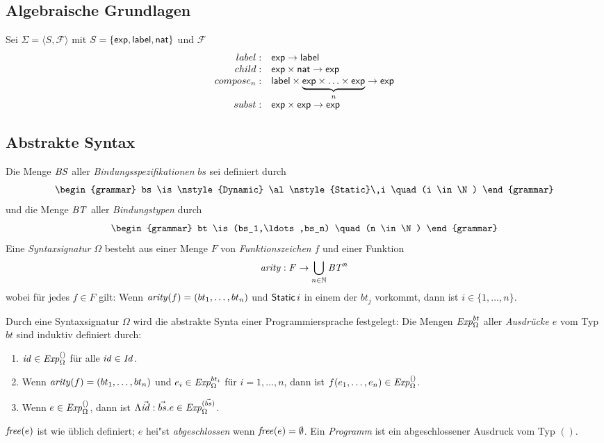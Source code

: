 \documentclass[12pt,a4paper]{article}
\begin{document}
\subsection*{Algebraische Grundlagen}

Sei $\Sigma = \langle S, \mathcal{F} \rangle$ mit 
$S = \{\mathsf{exp},\mathsf{label},\mathsf{nat}\}$ und $\mathcal{F}$
\[\begin{array}{rl}
label:& \mathsf{exp} \to \mathsf{label}\\
child:& \mathsf{exp} \times \mathsf{nat} \to \mathsf{exp}\\
compose_n:& \mathsf{label} \times \underbrace{\mathsf{exp} \times \ldots \times \mathsf{exp}}_n \to \mathsf{exp}\\
subst:& \mathsf{exp} \times \mathsf{exp} \to \mathsf{exp}\\
\end{array}\]


\subsection*{Abstrakte Syntax}

Die Menge $\mathit{BS}$ aller \emph{Bindungsspezifikationen} $bs$ sei definiert durch
\[\begin{grammar}
bs
\is \nstyle{Dynamic}
\al \nstyle{Static}\,i \quad (i \in \N)
\end{grammar}\]
und die Menge $\mathit{BT}$ aller \emph{Bindungstypen} durch
\[\begin{grammar}
bt \is (bs_1,\ldots,bs_n) \quad (n \in \N)
\end{grammar}\]
Eine \emph{Syntaxsignatur} $\Omega$ besteht aus einer Menge $F$ von \emph{Funktionszeichen} $f$
und einer Funktion
\[
\mathit{arity}: F \to \bigcup_{n\in\mathbb N}\mathit{BT}^n
\]
wobei f\"ur jedes $f \in F$ gilt: Wenn $\mathit{arity}(f) = (bt_1,\ldots,bt_n)$ und
$\mathsf{Static}\,i$ in einem der $bt_j$ vorkommt, dann ist $i \in \{1,\ldots,n\}$.

Durch eine Syntaxsignatur $\Omega$ wird die abstrakte Synta einer Programmiersprache
festgelegt: Die Mengen $\mathit{Exp}^{bt}_\Omega$ aller \emph{Ausdr\"ucke $e$} vom
Typ $bt$ sind induktiv definiert durch:
\begin{enumerate}
\item $\mathit{id} \in \mathit{Exp}^{()}_\Omega$ f\"ur alle $\mathit{id} \in \mathit{Id}$.
\item Wenn $\mathit{arity}(f)=(bt_1,\ldots,bt_n)$ und $e_i \in \mathit{Exp}^{bt_i}_\Omega$ f\"ur $i=1,\ldots,n$,
  dann ist $f(e_1,\ldots,e_n) \in \mathit{Exp}^{()}_\Omega$.
\item Wenn $e \in \mathit{Exp}^{()}_\Omega$, dann ist $\Lambda \vec{\mathit{id}}:\vec{bs}.e \in \mathit{Exp}^{(\vec{bs})}_\Omega$.
\end{enumerate}
$\mathit{free}(e)$ ist wie \"ublich definiert; $e$ hei"st \emph{abgeschlossen} wenn $\mathit{free}(e) = \emptyset$.
Ein \emph{Programm} ist ein abgeschlossener Ausdruck vom Typ $()$.
\end{document}
